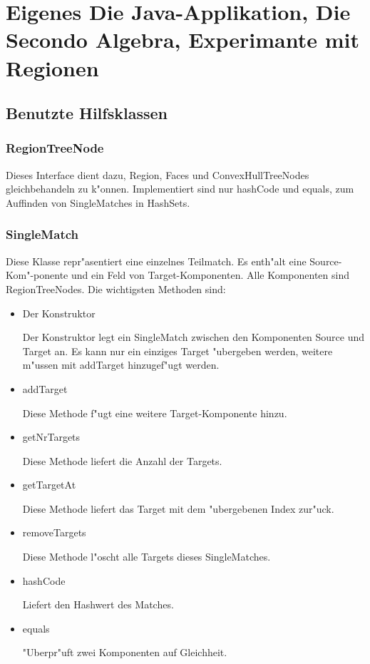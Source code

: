 \chapter[Eigenes]{Eigenes
\normalsize{Die Java-Applikation, Die Secondo Algebra, Experimante mit Regionen}
}
\minitoc
\newpage
\section{Benutzte Hilfsklassen}
\subsection{RegionTreeNode}

Dieses Interface dient dazu, Region, Faces und ConvexHullTreeNodes gleichbehandeln zu k"onnen. Implementiert sind nur hashCode und equals, zum Auffinden von SingleMatches in HashSets.

\subsection{SingleMatch}
Diese Klasse repr"asentiert eine einzelnes Teilmatch.  Es enth"alt eine Source-Kom"-ponente und ein Feld von Target-Komponenten. Alle Komponenten sind RegionTreeNodes.
Die wichtigsten Methoden sind:

\begin{itemize}
\item Der Konstruktor

Der Konstruktor legt ein SingleMatch zwischen den Komponenten Source und Target an. Es kann nur ein einziges Target "ubergeben werden, weitere m"ussen mit addTarget hinzugef"ugt werden.



\item addTarget

Diese Methode f"ugt eine weitere Target-Komponente hinzu.

\item getNrTargets

Diese Methode liefert die Anzahl der Targets.

\item getTargetAt

Diese Methode liefert das Target mit dem "ubergebenen Index zur"uck.

\item removeTargets

Diese Methode l"oscht alle Targets dieses SingleMatches.

\item hashCode

Liefert den Hashwert des Matches.

\item equals

"Uberpr"uft zwei Komponenten auf Gleichheit.

\end{itemize}

